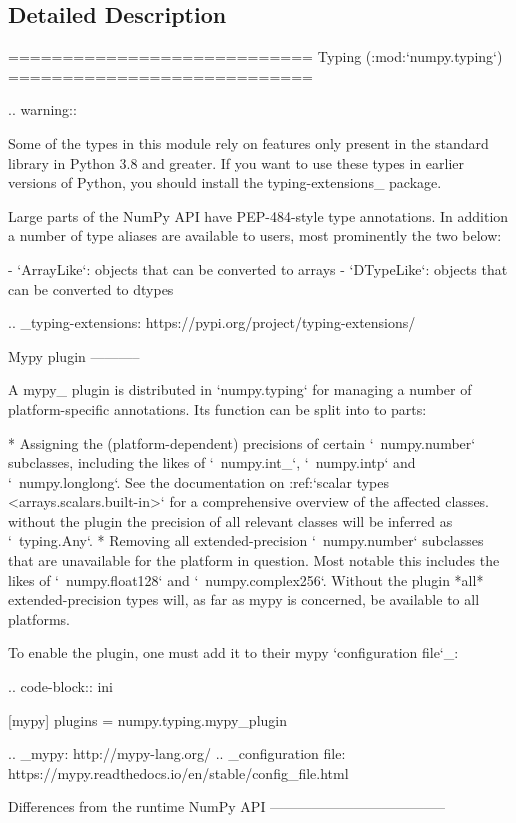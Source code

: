 \subsection{Detailed Description}
\begin{DoxyVerb}============================
Typing (:mod:`numpy.typing`)
============================

.. warning::

  Some of the types in this module rely on features only present in
  the standard library in Python 3.8 and greater. If you want to use
  these types in earlier versions of Python, you should install the
  typing-extensions_ package.

Large parts of the NumPy API have PEP-484-style type annotations. In
addition a number of type aliases are available to users, most prominently
the two below:

- `ArrayLike`: objects that can be converted to arrays
- `DTypeLike`: objects that can be converted to dtypes

.. _typing-extensions: https://pypi.org/project/typing-extensions/

Mypy plugin
-----------

A mypy_ plugin is distributed in `numpy.typing` for managing a number of
platform-specific annotations. Its function can be split into to parts:

* Assigning the (platform-dependent) precisions of certain `~numpy.number` subclasses,
  including the likes of `~numpy.int_`, `~numpy.intp` and `~numpy.longlong`.
  See the documentation on :ref:`scalar types <arrays.scalars.built-in>` for a
  comprehensive overview of the affected classes. without the plugin the precision
  of all relevant classes will be inferred as `~typing.Any`.
* Removing all extended-precision `~numpy.number` subclasses that are unavailable
  for the platform in question. Most notable this includes the likes of
  `~numpy.float128` and `~numpy.complex256`. Without the plugin *all*
  extended-precision types will, as far as mypy is concerned, be available
  to all platforms.

To enable the plugin, one must add it to their mypy `configuration file`_:

.. code-block:: ini

    [mypy]
    plugins = numpy.typing.mypy_plugin

.. _mypy: http://mypy-lang.org/
.. _configuration file: https://mypy.readthedocs.io/en/stable/config_file.html

Differences from the runtime NumPy API
--------------------------------------


\end{DoxyVerb}
